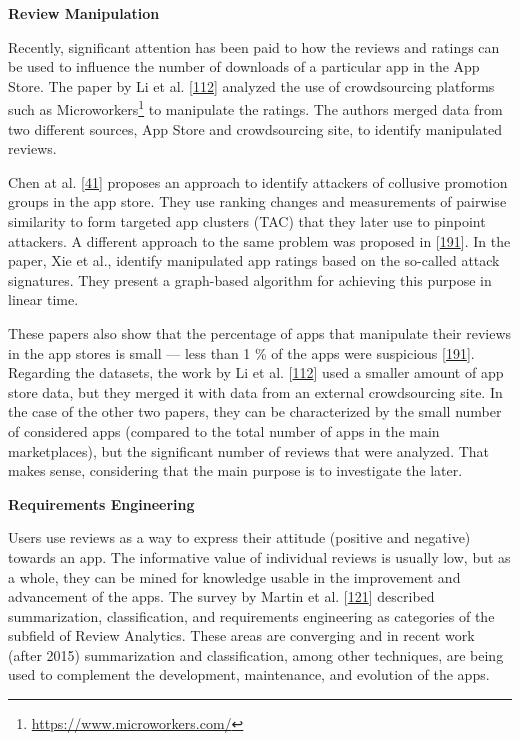\documentclass[]{book}
\let\rmarkdownfootnote\footnote%
\def\footnote{\protect\rmarkdownfootnote}
\begin{document}
\textbf{Review Manipulation}

Recently, significant attention has been paid to how the reviews and
ratings can be used to influence the number of downloads of a particular
app in the App Store. The paper by Li et al.
{[}\protect\hyperlink{ref-i2017crowdsourced}{112}{]} analyzed the use of
crowdsourcing platforms such as Microworkers\footnote{\url{https://www.microworkers.com/}}
to manipulate the ratings. The authors merged data from two different
sources, App Store and crowdsourcing site, to identify manipulated
reviews.

Chen at al. {[}\protect\hyperlink{ref-chen2017toward}{41}{]} proposes an
approach to identify attackers of collusive promotion groups in the app
store. They use ranking changes and measurements of pairwise similarity
to form targeted app clusters (TAC) that they later use to pinpoint
attackers. A different approach to the same problem was proposed in
{[}\protect\hyperlink{ref-xie2016you}{191}{]}. In the paper, Xie et al.,
identify manipulated app ratings based on the so-called attack
signatures. They present a graph-based algorithm for achieving this
purpose in linear time.

These papers also show that the percentage of apps that manipulate their
reviews in the app stores is small --- less than 1 \% of the apps were
suspicious {[}\protect\hyperlink{ref-xie2016you}{191}{]}. Regarding the
datasets, the work by Li et al.
{[}\protect\hyperlink{ref-i2017crowdsourced}{112}{]} used a smaller
amount of app store data, but they merged it with data from an external
crowdsourcing site. In the case of the other two papers, they can be
characterized by the small number of considered apps (compared to the
total number of apps in the main marketplaces), but the significant
number of reviews that were analyzed. That makes sense, considering that
the main purpose is to investigate the later.

\textbf{Requirements Engineering}

Users use reviews as a way to express their attitude (positive and
negative) towards an app. The informative value of individual reviews is
usually low, but as a whole, they can be mined for knowledge usable in
the improvement and advancement of the apps. The survey by Martin et al.
{[}\protect\hyperlink{ref-martin2015survey}{121}{]} described
summarization, classification, and requirements engineering as
categories of the subfield of Review Analytics. These areas are
converging and in recent work (after 2015) summarization and
classification, among other techniques, are being used to complement the
development, maintenance, and evolution of the apps.
\end{document}
